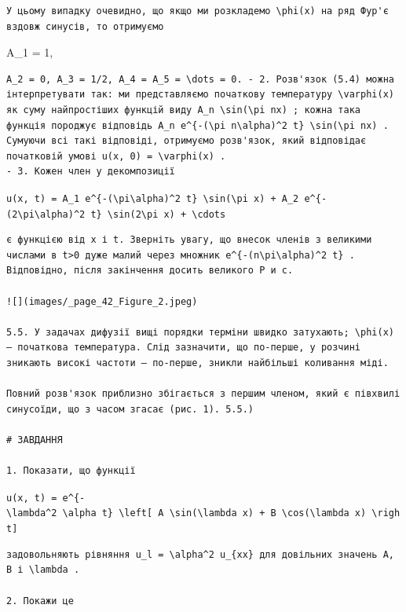 \documentclass[
  ukrainian,
]{article}
\begin{document}
\begin{verbatim}
У цьому випадку очевидно, що якщо ми розкладемо \phi(x) на ряд Фур'є вздовж синусів, то отримуємо
\end{verbatim}

A\_1 = 1,

\begin{verbatim}
A_2 = 0, A_3 = 1/2, A_4 = A_5 = \dots = 0. - 2. Розв'язок (5.4) можна інтерпретувати так: ми представляємо початкову температуру \varphi(x) як суму найпростіших функцій виду A_n \sin(\pi nx) ; кожна така функція породжує відповідь A_n e^{-(\pi n\alpha)^2 t} \sin(\pi nx) . Сумуючи всі такі відповіді, отримуємо розв'язок, який відповідає початковій умові u(x, 0) = \varphi(x) .
- 3. Кожен член у декомпозиції
\end{verbatim}

\texttt{u(x,\ t)\ =\ A\_1\ e\^{}\{-(\textbackslash{}pi\textbackslash{}alpha)\^{}2\ t\}\ \textbackslash{}sin(\textbackslash{}pi\ x)\ +\ A\_2\ e\^{}\{-(2\textbackslash{}pi\textbackslash{}alpha)\^{}2\ t\}\ \textbackslash{}sin(2\textbackslash{}pi\ x)\ +\ \textbackslash{}cdots}

\begin{verbatim}
є функцією від x і t. Зверніть увагу, що внесок членів з великими числами в t>0 дуже малий через множник e^{-(n\pi\alpha)^2 t} . Відповідно, після закінчення досить великого Р и с.

![](images/_page_42_Figure_2.jpeg)

5.5. У задачах дифузії вищі порядки терміни швидко затухають; \phi(x) — початкова температура. Слід зазначити, що по-перше, у розчині зникають високі частоти — по-перше, зникли найбільші коливання міді.

Повний розв'язок приблизно збігається з першим членом, який є півхвилі синусоїди, що з часом згасає (рис. 1). 5.5.)

# ЗАВДАННЯ

1. Показати, що функції
\end{verbatim}

\texttt{u(x,\ t)\ =\ e\^{}\{-\textbackslash{}lambda\^{}2\ \textbackslash{}alpha\textquotesingle{}\ t\}\ \textbackslash{}left{[}\ A\ \textbackslash{}sin(\textbackslash{}lambda\ x)\ +\ B\ \textbackslash{}cos(\textbackslash{}lambda\ x)\ \textbackslash{}right{]}}

\begin{verbatim}
задовольняють рівняння u_l = \alpha^2 u_{xx} для довільних значень A, B і \lambda .

2. Покажи це
\end{verbatim}
\end{document}
